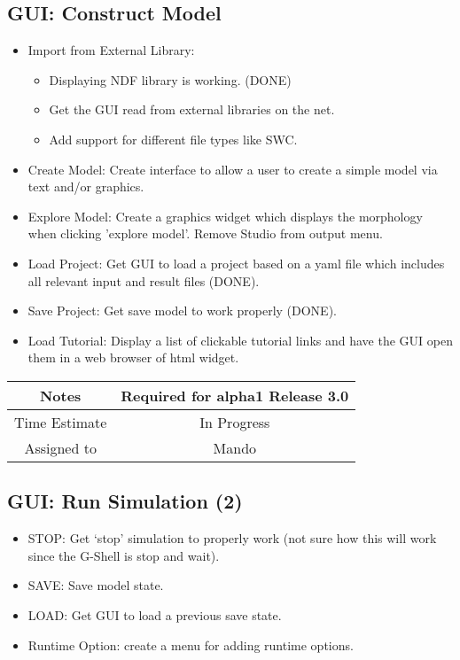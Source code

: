\documentclass[12pt]{article}
\begin{document}
\subsection{GUI: Construct Model}

\begin{itemize}
\item Import from External Library:
  \begin{itemize}
  \item Displaying NDF library is working. (DONE)
  \item Get the GUI read from external libraries on the net.
  \item Add support for different file types like SWC.
  \end{itemize}
\item Create Model: Create interface to allow a user to create a
  simple model via text and/or graphics.
\item Explore Model: Create a graphics widget which displays the
  morphology when clicking 'explore model'.  Remove Studio from output
  menu.
\item Load Project: Get GUI to load a project based on a yaml file
  which includes all relevant input and result files (DONE).
\item Save Project: Get save model to work properly (DONE).
\item Load Tutorial: Display a list of clickable tutorial links and
  have the GUI open them in a web browser of html widget.
\end{itemize}

{
  \vspace{5mm}
  \centering
  \begin{tabular}{|c|c|}
    \hline
    Notes
    & Required for alpha1 Release 3.0 \\
    \hline
    Time Estimate
    & In Progress \\
    \hline
    Assigned to
    & Mando \\
    \hline
  \end{tabular}
}


\subsection{GUI: Run Simulation (2)}
\begin{itemize}
\item STOP: Get `stop' simulation to properly work (not sure how this
  will work since the G-Shell is stop and wait).
\item SAVE: Save model state. 
\item LOAD: Get GUI to load a previous save state.
\item Runtime Option: create a menu for adding runtime options.
\end{itemize}
\end{document}
